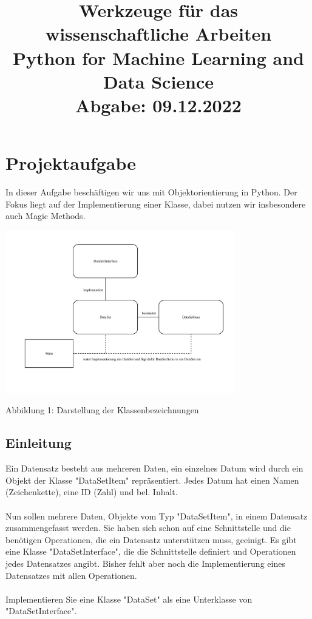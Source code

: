 \documentclass[]{article}
\title{Werkzeuge für das wissenschaftliche Arbeiten\\
Python for Machine Learning and Data Science\\
Abgabe: 09.12.2022}
\date{} %
\begin{document}
\maketitle
\subtitle{}

\tableofcontents
\section{Projektaufgabe}
In dieser Aufgabe beschäftigen wir uns mit Objektorientierung in Python.
Der Fokus liegt auf der Implementierung einer Klasse, dabei nutzen wir insbesondere auch Magic Methods.

\includegraphics[width=10cm]{diagram/classes_files.pdf}  
\begin{center}
\caption{Abbildung 1: Darstellung der Klassenbezeichnungen}
\end{center}
\subsection{Einleitung}
Ein Datensatz besteht aus mehreren Daten, ein einzelnes Datum wird durch ein Objekt der Klasse "DataSetItem" repräsentiert.
Jedes Datum hat einen Namen (Zeichenkette), eine ID (Zahl) und bel. Inhalt.\\
\\
Nun sollen mehrere Daten, Objekte vom Typ "DataSetItem", in einem Datensatz zusammengefasst werden.
Sie haben sich schon auf eine Schnittstelle und die benötigen Operationen, die ein Datensatz unterstützen muss, geeinigt.
Es gibt eine Klasse "DataSetInterface", die die Schnittstelle definiert und Operationen jedes Datensatzes angibt.
Bisher fehlt aber noch die Implementierung eines Datensatzes mit allen Operationen.\\
\\
Implementieren Sie eine Klasse "DataSet" als eine Unterklasse von "DataSetInterface".\\
\end{document}
